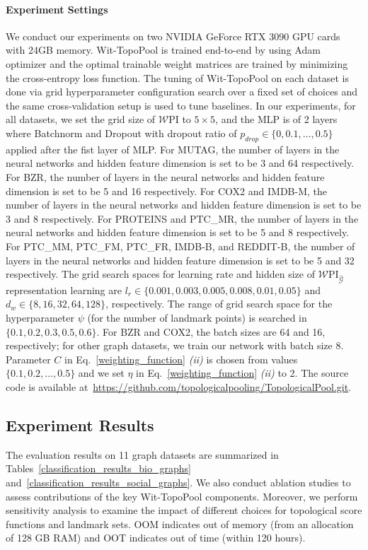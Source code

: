 \documentclass[letterpaper]{article} %
\begin{document}
\paragraph{Experiment Settings}
We conduct our experiments on two NVIDIA GeForce RTX 3090 GPU cards with 24GB memory. Wit-TopoPool is trained end-to-end by using Adam optimizer and the optimal trainable weight matrices are trained by minimizing the cross-entropy loss function. The tuning of Wit-TopoPool on each dataset is done via grid hyperparameter configuration search over a fixed set of choices and the same cross-validation setup is used to tune baselines. In our experiments, for all datasets, we set the grid size of $\mathcal{W}$PI to $5 \times 5$, and the MLP is of 2 layers where
Batchnorm and Dropout with dropout ratio of $p_{drop} \in \{0, 0.1, \dots, 0.5\}$ applied after the fist layer of MLP. For MUTAG, the number of layers in the neural networks and hidden feature dimension is set to be 3 and 64 respectively. For BZR, the number of layers in the neural networks and hidden feature dimension is set to be 5 and 16 respectively. For COX2 and IMDB-M, the number of layers in the neural networks and hidden feature dimension is set to be 3 and 8 respectively. For PROTEINS and PTC\_MR, the number of layers in the neural networks and hidden feature dimension is set to be 5 and 8 respectively. For PTC\_MM, PTC\_FM, PTC\_FR, IMDB-B, and REDDIT-B, the number of layers in the neural networks and hidden feature dimension is set to be 5 and 32 respectively. The grid search spaces for learning rate and hidden size of $\mathcal{W}\text{PI}_{\mathcal{\hat{G}}}$ representation learning are $l_{r} \in \{0.001, 0.003, 0.005, 0.008, 0.01, 0.05\}$ and $d_w \in \{8, 16, 32, 64, 128\}$, respectively. The range of grid search space for the hyperparameter $\psi$ (for the number of landmark points) is searched in $\{0.1, 0.2, 0.3, 0.5, 0.6\}$. For BZR and COX2, the batch sizes are 64 and 16, respectively; for other graph datasets, we train our network with batch size 8. Parameter $C$ in Eq.~\ref{weighting_function} {\it (ii)} is chosen from values $\{0.1, 0.2, \dots, 0.5\}$ and we set $\eta$ in Eq.~\ref{weighting_function} {\it (ii)} to 2. The source code is available at~\url{https://github.com/topologicalpooling/TopologicalPool.git}.%

\subsection{Experiment Results}
The evaluation results on 11 graph datasets are summarized in Tables~\ref{classification_results_bio_graphs} and~\ref{classification_results_social_graphs}.  We also conduct ablation studies to assess contributions of the key Wit-TopoPool components. Moreover, we perform sensitivity analysis to examine the impact of different choices for topological score functions and landmark sets. OOM indicates out of memory (from an allocation of 128 GB RAM) and OOT indicates out of time (within 120 hours).
\end{document}
